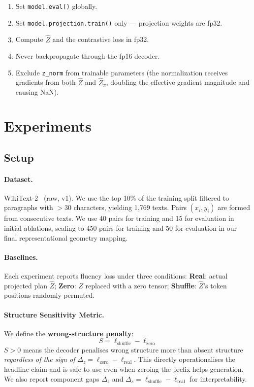 \documentclass[11pt]{article}
\begin{document}
\begin{enumerate}
  \item Set \texttt{model.eval()} globally.
  \item Set \texttt{model.projection.train()} only — projection weights are fp32.
  \item Compute $\hat{Z}$ and the contrastive loss in fp32.
  \item Never backpropagate through the fp16 decoder.
  \item Exclude \texttt{z\_norm} from trainable parameters (the normalization
    receives gradients from both $\hat{Z}$ and $\hat{Z}_\pi$, doubling the
    effective gradient magnitude and causing NaN).
\end{enumerate}

\section{Experiments}
\label{sec:experiments}

\subsection{Setup}

\paragraph{Dataset.} WikiText-2~\citep{merity2017pointer} (raw, v1).
We use the top 10\% of the training split filtered to paragraphs with $>30$
characters, yielding 1{,}769 texts.
Pairs $(x_i, y_i)$ are formed from consecutive texts.
We use 40 pairs for training and 15 for evaluation in initial ablations, scaling to 450 pairs for training and 50 for evaluation in our final representational geometry mapping.

\paragraph{Baselines.}
Each experiment reports fluency loss under three conditions:
\textbf{Real}: actual projected plan $\hat{Z}$;
\textbf{Zero}: $\hat{Z}$ replaced with a zero tensor;
\textbf{Shuffle}: $\hat{Z}$'s token positions randomly permuted.

\paragraph{Structure Sensitivity Metric.}
We define the \textbf{wrong-structure penalty}:
\begin{equation}
  S = \ell_\mathrm{shuffle} - \ell_\mathrm{zero}
  \label{eq:S}
\end{equation}
$S > 0$ means the decoder penalises wrong structure more than absent structure
\emph{regardless of the sign of} $\Delta_z = \ell_\mathrm{zero} - \ell_\mathrm{real}$.
This directly operationalises the headline claim and is safe to use even when
zeroing the prefix helps generation.
We also report component gaps $\Delta_z$ and $\Delta_s = \ell_\mathrm{shuffle} - \ell_\mathrm{real}$
for interpretability.
\end{document}
